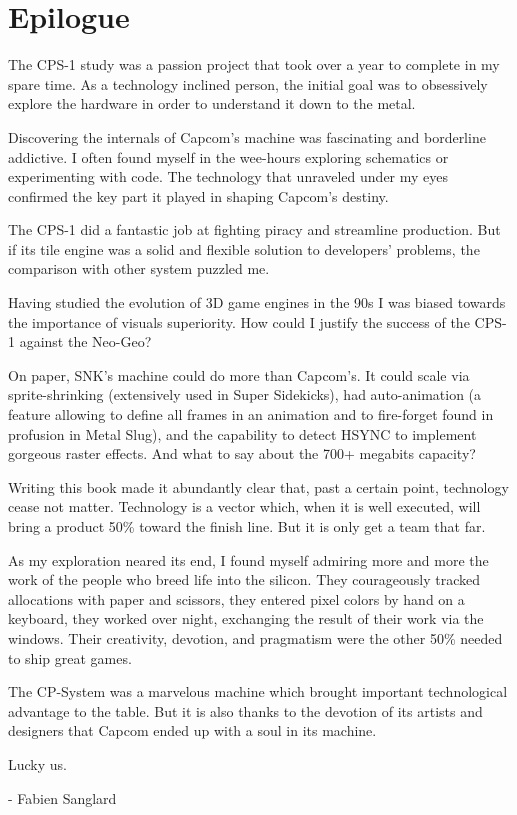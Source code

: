 \chapter{Epilogue} 

The CPS-1 study was a passion project that took over a year to complete in my spare time. As a technology inclined person, the initial goal was to obsessively explore the hardware in order to understand it down to the metal.

Discovering the internals of Capcom's machine was fascinating and borderline addictive. I often found myself in the wee-hours exploring schematics or experimenting with code. The technology that unraveled under my eyes confirmed the key part it played in shaping Capcom's destiny. 

The CPS-1 did a fantastic job at fighting piracy and streamline production. But if its tile engine was a solid and flexible solution to developers' problems, the comparison with other system puzzled me.

Having studied the evolution of 3D game engines in the 90s I was biased towards the importance of visuals superiority. How could I justify the success of the CPS-1 against the Neo-Geo? 

On paper, SNK's machine could do more than Capcom's. It could scale via sprite-shrinking (extensively used in Super Sidekicks),
had auto-animation (a feature allowing to define all frames in an animation and to fire-forget found in profusion in Metal Slug), and the capability to detect HSYNC to implement gorgeous raster effects. And what to say about the 700+ megabits capacity?

Writing this book made it abundantly clear that, past a certain point, technology cease not matter. Technology is a vector which, when it is well executed, will bring a product 50\% toward the finish line. But it is only get a team that far.

As my exploration neared its end, I found myself admiring more and more the work of the people who breed life into the silicon.   
They courageously tracked allocations with paper and scissors, they entered pixel colors by hand on a keyboard, they worked over night, exchanging the result of their work via the windows. Their creativity, devotion, and pragmatism were the other 50\% needed to ship great games.

The CP-System was a marvelous machine which brought important technological advantage to the table. But it is also thanks to the devotion of its artists and designers that Capcom ended up with a soul in its machine.

Lucky us.

- Fabien Sanglard
